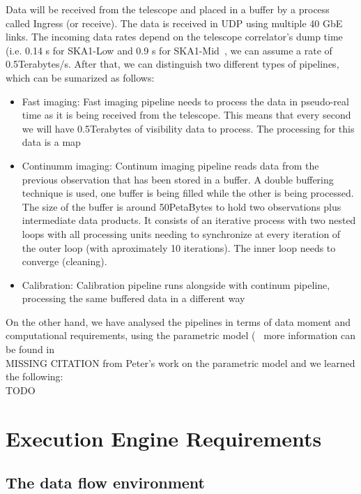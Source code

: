 \documentclass[11pt,a4paper]{article}
\begin{document}
Data will be received from the telescope and placed in a buffer by a process called Ingress (or receive). The data is received in UDP using multiple 
40 GbE links. The incoming data rates depend on the telescope correlator's dump time (i.e. 0.14 s for SKA1-Low and 0.9 s for SKA1-Mid~\cite{ParametricModel}, we can assume a rate of 0.5Terabytes/s. After that, we can distinguish two different types of pipelines, which can be 
sumarized as follows:
\begin{itemize}
\item Fast imaging: Fast imaging pipeline needs to process the data in pseudo-real time as it is being received from the telescope.
 This means that every second we will have 0.5Terabytes of visibility data to process. The processing for this data is a map
\item Continumm imaging: Continum imaging pipeline reads data from the previous observation that has been stored in a buffer.
A double buffering technique is used, one buffer is being filled while the other is being processed. The size of the buffer is around 50PetaBytes
to hold two observations plus intermediate data products. It consists of an iterative process with two nested loops with all processing units needing
to synchronize at every iteration of the outer loop (with aproximately 10 iterations). The inner loop needs to converge (cleaning).
\item Calibration: Calibration pipeline runs alongside with continum pipeline, processing the same buffered data in a different way
\end{itemize}


On the other hand, we have analysed the pipelines in terms of data moment and computational requirements, using 
the parametric model (~\cite{ParametricModel} more information
can be found in \\ MISSING CITATION from Peter's work on the parametric model
and we learned the following:  \\ TODO





\section{Execution Engine Requirements}
\subsection{The data flow environment}
\end{document}
